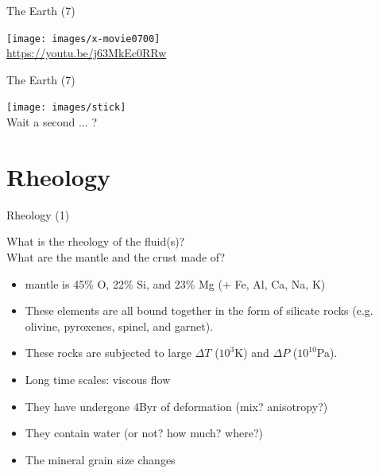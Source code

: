 \documentclass[handout]{beamer}
\begin{document}
\begin{frame}[plain]{The Earth (7)}

\begin{center}
\texttt{[image: images/x-movie0700]}\\
{\tiny \url{https://youtu.be/j63MkEc0RRw}}
\end{center}
\end{frame}

\begin{frame}[plain]{The Earth (7)}

\begin{center}
\texttt{[image: images/stick]}\\
Wait a second ... ?
\end{center}

\end{frame}


\section{Rheology}

\begin{frame}[plain]{Rheology (1)}

What is the rheology of the fluid(s)?\\ \pause
What are the mantle and the crust made of?

\pause
 
\begin{itemize}
\item mantle is  45\% O, 22\% Si, and 23\% Mg (+ Fe, Al, Ca, Na, K)
\item These elements are all bound together in the form of silicate rocks (e.g. olivine, pyroxenes, spinel, and garnet).
\item These rocks are subjected to large $\Delta T$ ($10^3$K) and $\Delta P$ ($10^{10}$Pa).
\item Long time scales: viscous flow
\item They have undergone 4Byr of deformation (mix? anisotropy?)
\item They contain water (or not? how much? where?)
\item The mineral grain size changes  
\end{itemize}

\end{frame}
\end{document}
